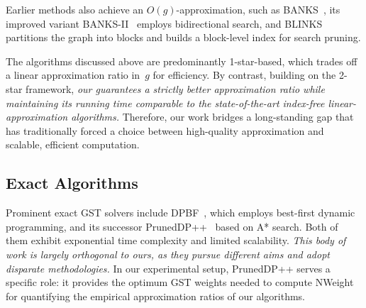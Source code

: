 Earlier methods also achieve an $O(g)$-approximation, such as BANKS~\cite{BANKS}, its improved variant BANKS-II~\cite{BANKS2}  employs bidirectional search, and BLINKS~\cite{BLINKS}  partitions the graph into blocks and builds a block-level index for search pruning.

The algorithms discussed above are predominantly 1-star-based, which trades off a linear approximation ratio in~$g$ for efficiency. By contrast, building on the 2-star framework, \emph{our \ImprovPTS guarantees a strictly better approximation ratio while maintaining its running time comparable to the state-of-the-art index-free linear-approximation algorithms.} Therefore, our work bridges a long-standing gap that has traditionally forced a choice between high-quality approximation and scalable, efficient computation.

\subsection{Exact Algorithms} 

Prominent exact GST solvers include DPBF~\cite{KS_5}, which employs best-first dynamic programming, and its successor PrunedDP++~\cite{PrunedDP} based on A* search. Both of them exhibit exponential time complexity and limited scalability. \emph{This body of work is largely orthogonal to ours, as they pursue different aims and adopt disparate methodologies.} In our experimental setup, PrunedDP++ serves a specific role: it provides the optimum GST weights needed to compute NWeight for quantifying the empirical approximation ratios of our algorithms.


